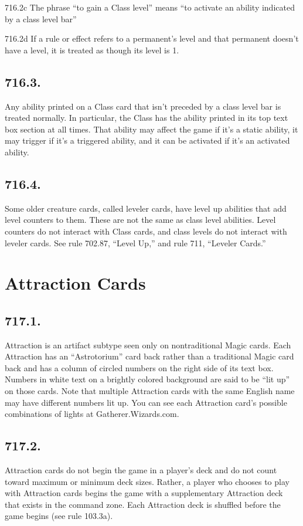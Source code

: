 716.2c The phrase “to gain a Class level” means “to activate an ability indicated by a class level bar”

716.2d If a rule or effect refers to a permanent’s level and that permanent doesn’t have a level, it is treated as though its level is 1.

\subsection*{716.3.}
Any ability printed on a Class card that isn’t preceded by a class level bar is treated normally. In particular, the Class has the ability printed in its top text box section at all times. That ability may affect the game if it’s a static ability, it may trigger if it’s a triggered ability, and it can be activated if it’s an activated ability.

\subsection*{716.4.}
Some older creature cards, called leveler cards, have level up abilities that add level counters to them. These are not the same as class level abilities. Level counters do not interact with Class cards, and class levels do not interact with leveler cards. See rule 702.87, “Level Up,” and rule 711, “Leveler Cards.”

\section{Attraction Cards}
\subsection*{717.1.}
Attraction is an artifact subtype seen only on nontraditional Magic cards. Each Attraction has an “Astrotorium” card back rather than a traditional Magic card back and has a column of circled numbers on the right side of its text box. Numbers in white text on a brightly colored background are said to be “lit up” on those cards. Note that multiple Attraction cards with the same English name may have different numbers lit up. You can see each Attraction card’s possible combinations of lights at Gatherer.Wizards.com.

\subsection*{717.2.}
Attraction cards do not begin the game in a player’s deck and do not count toward maximum or minimum deck sizes. Rather, a player who chooses to play with Attraction cards begins the game with a supplementary Attraction deck that exists in the command zone. Each Attraction deck is shuffled before the game begins (see rule 103.3a).

